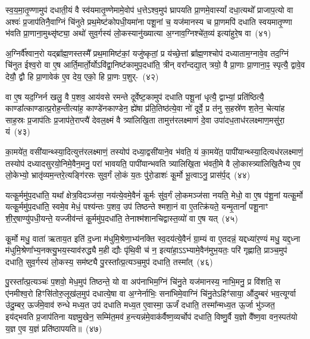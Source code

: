 {\anuvakamend[{वन॒स्पत॑यो दक्षिण॒तो ध॑त्त एनं॒ तस्मा॑दक्ष्ण॒या पञ्च॑ च}]}

स्व॒य॒मा॒तृ॒ण्णामुप॑ दधाती॒यं वै स्व॑यमातृ॒ण्णेमामे॒वोप॑ ध॒त्ते\-ऽश्व॒मुप॑ घ्रापयति प्रा॒णमे॒वास्यां᳚ दधा॒त्यथो᳚ प्राजाप॒त्यो वा अश्वः॑ प्र॒जा\-प॑तिनै॒वाग्निं चि॑नुते प्रथ॒मेष्ट॑कोपधी॒यमा॑ना पशू॒नां च॒ यज॑मानस्य च प्रा॒णमपि॑ दधाति स्वयमा\-तृ॒ण्णा भ॑वति प्रा॒णाना॒मुथ्सृ॑ष्ट्या॒ अथो॑ सुव॒र्गस्य॑ लो॒कस्यानु॑ख्यात्या अ॒ग्नाव॒ग्निश्चे॑त॒व्य॑ इत्या॑हुरे॒ष वा~(४१)\ip

अ॒ग्निर्वै᳚श्वान॒रो यद्ब्रा᳚ह्म॒णस्तस्मै᳚ प्रथ॒मामिष्ट॑कां॒ यजु॑ष्कृतां॒ प्र य॑च्छे॒त्तां ब्रा᳚ह्म॒णश्चोप॑ दध्याताम॒ग्नावे॒व तद॒ग्निं चि॑नुत ईश्व॒रो वा ए॒ष आर्ति॒मार्तो॒र्यो\-ऽवि॑द्वा॒निष्ट॑कामुप॒\-दधा॑ति॒ त्रीन् वरा᳚न्दद्या॒त् त्रयो॒ वै प्रा॒णाः प्रा॒णाना॒ꣴ॒ स्पृत्यै॒ द्वावे॒व देयौ॒ द्वौ हि प्रा॒णावेक॑ ए॒व देय॒ एको॒ हि प्रा॒णः प॒शुर्-~(४२)\ip

वा ए॒ष यद॒ग्निर्न खलु॒ वै प॒शव॒ आय॑वसे रमन्ते दूर्वेष्ट॒कामुप॑ दधाति पशू॒नां धृत्यै॒ द्वाभ्यां॒ प्रति॑ष्ठित्यै॒ काण्डा᳚त्काण्डात्प्र॒रोह॒न्तीत्या॑ह॒ काण्डे॑नकाण्डेन॒ ह्ये॑षा प्र॑ति॒तिष्ठ॑त्ये॒वा नो॑ दूर्वे॒ प्र त॑नु स॒हस्रे॑ण श॒तेन॒ चेत्या॑ह साह॒स्रः प्र॒जा\-प॑तिः प्र॒जा\-प॑ते॒राप्त्यै॑ देवल॒क्ष्मं वै त्र्या॑लिखि॒ता तामुत्त॑रलक्ष्माणं दे॒वा उपा॑दध॒ताध॑रलक्ष्माण॒मसु॑रा॒ यं~(४३)\ip

का॒मये॑त॒ वसी॑यान्थ्स्या॒दित्युत्त॑रलक्ष्माणं॒ तस्योप॑ दध्या॒द्वसी॑याने॒व भ॑वति॒ यं का॒मये॑त॒ पापी॑यान्थ्स्या॒दित्यध॑र\-लक्ष्माणं॒ तस्योप॑ दध्यादसुरयो॒निमे॒वैन॒मनु॒ परा॑ भावयति॒ पापी॑यान्भवति त्र्यालिखि॒ता भ॑वती॒मे वै लो॒का\-स्त्र्या॑लिखि॒तैभ्य ए॒व लो॒केभ्यो॒ भ्रातृ॑व्यम॒न्तरे॒त्यङ्गि॑रसः सुव॒र्गं लो॒कं य॒तः पु॑रो॒डाशः॑ कू॒र्मो भू॒त्वाऽनु॒ प्रास॑र्प॒द्~(४४)\ip

यत्कू॒र्ममु॑प॒\-दधा॑ति॒ यथा᳚ क्षेत्र॒विदञ्ज॑सा॒ नय॑त्ये॒वमे॒वैनं॑ कू॒र्मः सु॑व॒र्गं लो॒कमञ्ज॑सा नयति॒ मेधो॒ वा ए॒ष प॑शू॒नां यत्कू॒र्मो यत्कू॒र्ममु॑प॒\-दधा॑ति॒ स्वमे॒व मेधं॒ पश्य॑न्तः प॒शव॒ उप॑ तिष्ठन्ते श्मशा॒नं वा ए॒तत्क्रि॑यते॒ यन्मृ॒तानां᳚ पशू॒नाꣳ शी॒र्॒\mbox{}षाण्यु॑पधी॒यन्ते॒ यज्जीव॑न्तं कू॒र्ममु॑प॒\-दधा॑ति॒ तेनाश्म॑शानचिद्वास्त॒व्यो॑ वा ए॒ष यत्~(४५)\ip

कू॒र्मो मधु॒ वाता॑ ऋताय॒त इति॑ द॒ध्ना म॑धुमि॒श्रेणा॒भ्य॑नक्ति स्व॒दय॑त्ये॒वैनं॑ ग्रा॒म्यं वा ए॒तदन्नं॒ यद्दध्या॑र॒ण्यं मधु॒ यद्द॒ध्ना म॑धुमि॒श्रेणा᳚भ्य॒नक्त्यु॒भय॒स्याव॑रुद्ध्यै म॒ही द्यौः पृ॑थि॒वी च॑ न॒ इत्या॑हा॒ऽऽभ्यामे॒वैन॑मुभ॒यतः॒ परि॑ गृह्णाति॒ प्राञ्च॒मुप॑ दधाति॒ सुव॒र्गस्य॑ लो॒कस्य॒ सम॑ष्ट्यै पु॒रस्ता᳚त्प्र॒त्यञ्च॒मुप॑ दधाति॒ तस्मा᳚त्~(४६)\ip

पु॒रस्ता᳚त्प्र॒त्यञ्चः॑ प॒शवो॒ मेध॒मुप॑ तिष्ठन्ते॒ यो वा अप॑नाभिम॒ग्निं चि॑नु॒ते यज॑मानस्य॒ नाभि॒मनु॒ प्र वि॑शति॒ स ए॑नमीश्व॒रो हिꣳसि॑तोरु॒लूख॑ल॒मुप॑ दधात्ये॒षा वा अ॒ग्नेर्नाभिः॒ सना॑भिमे॒वाग्निं चि॑नु॒ते\-ऽहिꣳ॑साया॒ औ॑दुम्बरं भव॒त्यूर्ग्वा उ॑दु॒म्बर॒ ऊर्ज॑मे॒वाव॑ रुन्धे मध्य॒त उप॑ दधाति मध्य॒त ए॒वास्मा॒ ऊर्जं॑ दधाति॒ तस्मा᳚न्मध्य॒त ऊ॒र्जा भु॑ञ्जत॒ इय॑द्भवति प्र॒जा\-प॑तिना यज्ञमु॒खेन॒ सम्मि॑त॒मव॑ ह॒न्त्यन्न॑मे॒वाक॑र्वैष्ण॒व्यर्चोप॑ दधाति॒ विष्णु॒र्वै य॒ज्ञो वै᳚ष्ण॒वा वन॒स्पत॑यो य॒ज्ञ ए॒व य॒ज्ञं प्रति॑\-ष्ठापयति॥~(४७)\ip

